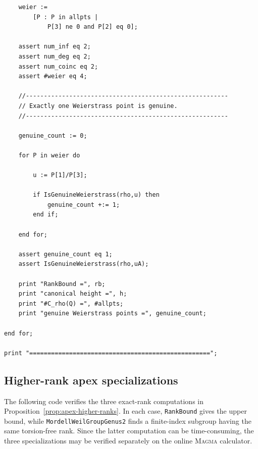 \documentclass[11pt]{amsart}
\theoremstyle{plain}
\theoremstyle{remark}
\theoremstyle{plain}
\begin{document}
\begin{verbatim}
    weier :=
        [P : P in allpts |
            P[3] ne 0 and P[2] eq 0];

    assert num_inf eq 2;
    assert num_deg eq 2;
    assert num_coinc eq 2;
    assert #weier eq 4;

    //--------------------------------------------------------
    // Exactly one Weierstrass point is genuine.
    //--------------------------------------------------------

    genuine_count := 0;

    for P in weier do

        u := P[1]/P[3];

        if IsGenuineWeierstrass(rho,u) then
            genuine_count +:= 1;
        end if;

    end for;

    assert genuine_count eq 1;
    assert IsGenuineWeierstrass(rho,uA);

    print "RankBound =", rb;
    print "canonical height =", h;
    print "#C_rho(Q) =", #allpts;
    print "genuine Weierstrass points =", genuine_count;

end for;

print "==================================================";
\end{verbatim}

\subsection{Higher-rank apex specializations}
\label{app:apex-higher-ranks}

The following code verifies the three exact-rank computations in
Proposition~\ref{prop:apex-higher-ranks}. In each case,
\texttt{RankBound} gives the upper bound, while
\texttt{MordellWeilGroupGenus2} finds a finite-index subgroup having
the same torsion-free rank. Since the latter computation can be
time-consuming, the three specializations may be verified separately
on the online \textsc{Magma} calculator.
\end{document}
